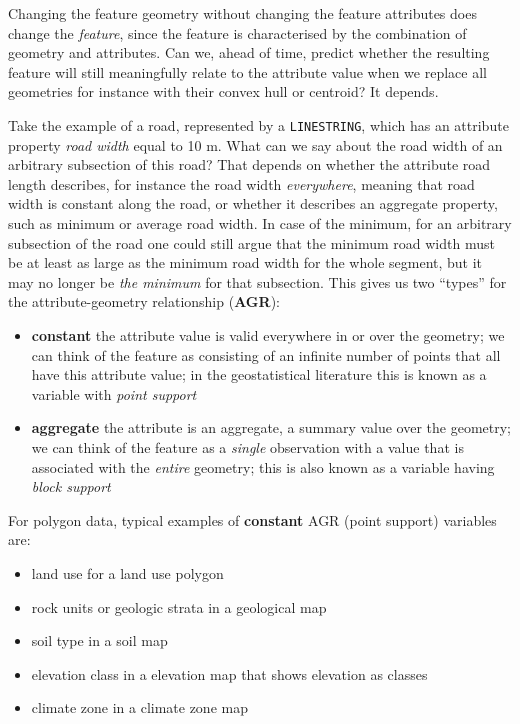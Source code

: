 \documentclass[]{book}
\providecommand{\tightlist}{%
  \setlength{\itemsep}{0pt}\setlength{\parskip}{0pt}}
\begin{document}
Changing the feature geometry without changing the feature attributes
does change the \emph{feature}, since the feature is characterised by
the combination of geometry and attributes. Can we, ahead of time,
predict whether the resulting feature will still meaningfully relate
to the attribute value when we replace all geometries for instance
with their convex hull or centroid? It depends.

Take the example of a road, represented by a \texttt{LINESTRING}, which has
an attribute property \emph{road width} equal to 10 m. What can we say about
the road width of an arbitrary subsection of this road? That depends
on whether the attribute road length describes, for instance the
road width \emph{everywhere}, meaning that road width is constant along the
road, or whether it describes an aggregate property, such as minimum
or average road width. In case of the minimum, for an arbitrary
subsection of the road one could still argue that the minimum
road width must be at least as large as the minimum road width for
the whole segment, but it may no longer be \emph{the minimum} for that
subsection. This gives us two ``types'' for the attribute-geometry
relationship (\textbf{AGR}):

\begin{itemize}
\tightlist
\item
  \textbf{constant} the attribute value is valid everywhere in or over the
  geometry; we can think of the feature as consisting of an infinite
  number of points that all have this attribute value; in the geostatistical
  literature this is known as a variable with \emph{point support}
\item
  \textbf{aggregate} the attribute is an aggregate, a summary value over
  the geometry; we can think of the feature as a \emph{single} observation
  with a value that is associated with the \emph{entire} geometry; this is
  also known as a variable having \emph{block support}
\end{itemize}

For polygon data, typical examples of \textbf{constant} AGR (point
support) variables are:

\begin{itemize}
\tightlist
\item
  land use for a land use polygon
\item
  rock units or geologic strata in a geological map
\item
  soil type in a soil map
\item
  elevation class in a elevation map that shows elevation as classes
\item
  climate zone in a climate zone map
\end{itemize}
\end{document}

